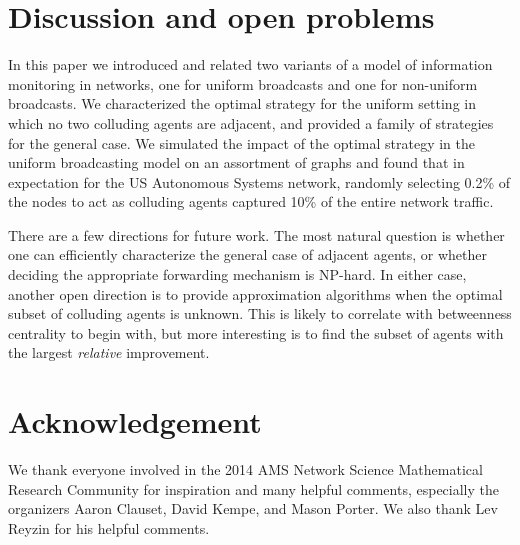 \documentclass[reprint]{revtex4-1}
\begin{document}
\section{Discussion and open problems} \label{sec:conclusion}

In this paper we introduced and related two variants of a model of
information monitoring in networks, one for uniform broadcasts and one for
non-uniform broadcasts. We characterized the optimal strategy for the uniform
setting in which no two colluding agents are adjacent, and provided a family of
strategies for the general case. We simulated the impact of the optimal
strategy in the uniform broadcasting model on an assortment of graphs and found
that in expectation for the US Autonomous Systems network, randomly selecting
0.2\% of the nodes to act as colluding agents captured 10\% of the entire
network traffic.  

There are a few directions for future work. The most natural question is
whether one can efficiently characterize the general case of adjacent agents,
or whether deciding the appropriate forwarding mechanism is NP-hard. In either
case, another open direction is to provide approximation algorithms when the
optimal subset of colluding agents is unknown. This is likely to correlate with
betweenness centrality to begin with, but more interesting is to find the
subset of agents with the largest \emph{relative} improvement.

\section*{Acknowledgement} 
We thank everyone involved in the 2014 AMS Network Science Mathematical Research Community for inspiration and many helpful comments, especially the organizers Aaron Clauset, David Kempe, and Mason Porter. We also thank Lev Reyzin for his helpful comments.



\end{document}
